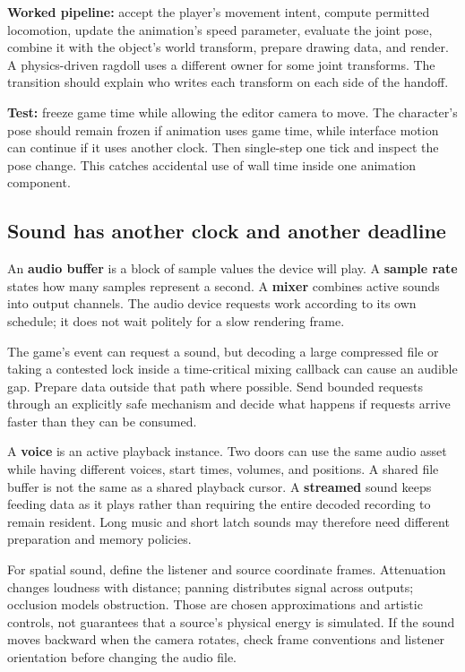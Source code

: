 \textbf{Worked pipeline:} accept the player's movement intent, compute permitted locomotion, update the animation's speed parameter, evaluate the joint pose, combine it with the object's world transform, prepare drawing data, and render. A physics-driven ragdoll uses a different owner for some joint transforms. The transition should explain who writes each transform on each side of the handoff.

\textbf{Test:} freeze game time while allowing the editor camera to move. The character's pose should remain frozen if animation uses game time, while interface motion can continue if it uses another clock. Then single-step one tick and inspect the pose change. This catches accidental use of wall time inside one animation component.

\subsection{Sound has another clock and another deadline}\label{06-engine-ii-ch040-sound-has-another-clock-and-another-deadline}

\hypertarget{06-engine-ii-ch040-sound-has-another-clock-and-another-deadline}{}

An \textbf{audio buffer} is a block of sample values the device will play. A \textbf{sample rate} states how many samples represent a second. A \textbf{mixer} combines active sounds into output channels. The audio device requests work according to its own schedule; it does not wait politely for a slow rendering frame.

The game's  event can request a sound, but decoding a large compressed file or taking a contested lock inside a time-critical mixing callback can cause an audible gap. Prepare data outside that path where possible. Send bounded requests through an explicitly safe mechanism and decide what happens if requests arrive faster than they can be consumed.

A \textbf{voice} is an active playback instance. Two doors can use the same audio asset while having different voices, start times, volumes, and positions. A shared file buffer is not the same as a shared playback cursor. A \textbf{streamed} sound keeps feeding data as it plays rather than requiring the entire decoded recording to remain resident. Long music and short latch sounds may therefore need different preparation and memory policies.

For spatial sound, define the listener and source coordinate frames. Attenuation changes loudness with distance; panning distributes signal across outputs; occlusion models obstruction. Those are chosen approximations and artistic controls, not guarantees that a source's physical energy is simulated. If the sound moves backward when the camera rotates, check frame conventions and listener orientation before changing the audio file.

